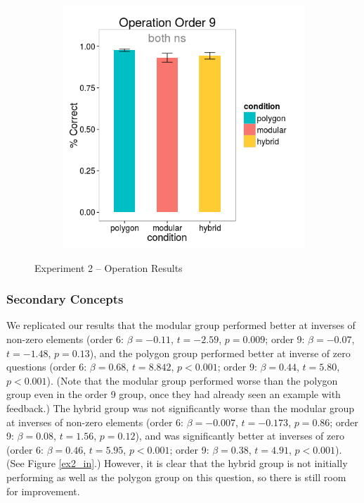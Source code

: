 \documentclass[11pt]{article}
\begin{document}
\begin{figure}[H]
\begin{subfigure}[c]{0.4\textwidth}
\includegraphics[width=\textwidth]{figures/2/op_9_r.png}
\end{subfigure}
\caption{Experiment 2 -- Operation Results}
\label{ex2_op}
\end{figure} 
\subsubsection{Secondary Concepts}
We replicated our results that the modular group performed better at inverses of non-zero elements (order 6: $\beta = -0.11$, $t = -2.59$, $p = 0.009$; order 9: $\beta = -0.07$, $t = -1.48$, $p = 0.13$), and the polygon group performed better at inverse of zero questions (order 6: $\beta = 0.68$, $t = 8.842$, $p < 0.001$; order 9: $\beta = 0.44$, $t = 5.80$, $p < 0.001$). (Note that the modular group performed worse than the polygon group even in the order 9 group, once they had already seen an example with feedback.) The hybrid group was not significantly worse than the modular group at inverses of non-zero elements (order 6: $\beta = -0.007$, $t = -0.173$, $p = 0.86$; order 9: $\beta = 0.08$, $t = 1.56$, $p = 0.12$), and was significantly better at inverses of zero (order 6: $\beta = 0.46$, $t = 5.95$, $p < 0.001$; order 9: $\beta = 0.38$, $t = 4.91$, $p < 0.001$). (See Figure \ref{ex2_in}.) However, it is clear that the hybrid group is not initially performing as well as the polygon group on this question, so there is still room for improvement. \\[11pt] 
\end{document}
